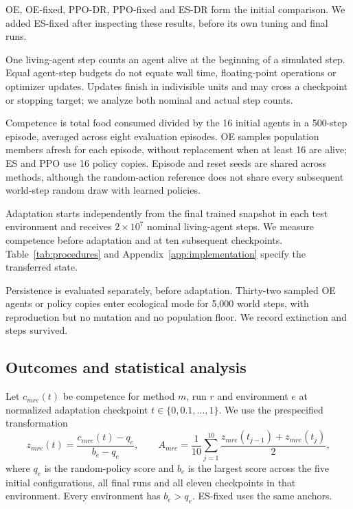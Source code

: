 OE, OE-fixed, PPO-DR, PPO-fixed and ES-DR form the initial comparison. We added ES-fixed after inspecting these results, before its own tuning and final runs.

One living-agent step counts an agent alive at the beginning of a simulated step. Equal agent-step budgets do not equate wall time, floating-point operations or optimizer updates. Updates finish in indivisible units and may cross a checkpoint or stopping target; we analyze both nominal and actual step counts.

Competence is total food consumed divided by the 16 initial agents in a 500-step episode, averaged across eight evaluation episodes. OE samples population members afresh for each episode, without replacement when at least 16 are alive; ES and PPO use 16 policy copies. Episode and reset seeds are shared across methods, although the random-action reference does not share every subsequent world-step random draw with learned policies.

Adaptation starts independently from the final trained snapshot in each test environment and receives $2\times10^7$ nominal living-agent steps. We measure competence before adaptation and at ten subsequent checkpoints. Table~\ref{tab:procedures} and Appendix~\ref{app:implementation} specify the transferred state.

Persistence is evaluated separately, before adaptation. Thirty-two sampled OE agents or policy copies enter ecological mode for 5,000 world steps, with reproduction but no mutation and no population floor. We record extinction and steps survived. 

\subsection{Outcomes and statistical analysis}
\label{sec:statistics}
Let $c_{mre}(t)$ be competence for method $m$, run $r$ and environment $e$ at normalized adaptation checkpoint $t\in\{0,0.1,\ldots,1\}$. We use the prespecified transformation
\begin{equation}
 z_{mre}(t)=\frac{c_{mre}(t)-q_e}{b_e-q_e},\qquad
 A_{mre}=\frac{1}{10}\sum_{j=1}^{10}\frac{z_{mre}(t_{j-1})+z_{mre}(t_j)}{2},
 \label{eq:auc}
\end{equation}
where $q_e$ is the random-policy score and $b_e$ is the largest score across the five initial configurations, all final runs and all eleven checkpoints in that environment. Every environment has $b_e>q_e$. ES-fixed uses the same anchors.

